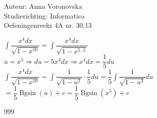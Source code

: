 \documentclass[a4paper]{article}
\begin{document}
  
\noindent \large Auteur: Anna Voronovska \\
\noindent \large Studierichting: Informatica\\
\noindent \large Oefeningenreeks 4A nr. 30.13\\

\medskip

\normalsize

$\displaystyle\int\dfrac{x^4dx}{\sqrt{1-x^{10}}}=\displaystyle\int\dfrac{x^4dx}{\sqrt{1-x^{5 \cdot 2}}}$\\

$u = x^5 \Rightarrow du = 5x^4dx \Rightarrow x^4dx = \dfrac{1}{5}du$\\

$\displaystyle\int\dfrac{x^4dx}{\sqrt{1-x^{10}}} = \displaystyle\int\dfrac{1}{\sqrt{1-u^2}}\cdot\dfrac{1}{5}du = \dfrac{1}{5}\displaystyle\int\dfrac{1}{\sqrt{1-u^2}}du$\\

$= \dfrac{1}{5} \operatorname{Bgsin}(u) + c = \dfrac{1}{5} \operatorname{Bgsin}(x^5) + c$\\


\begin{thebibliography}{999}
\end{thebibliography}
\end{document}
